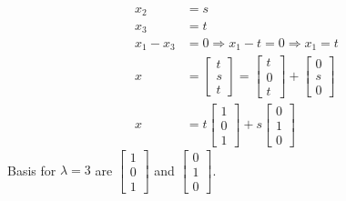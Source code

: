 \documentclass[12pt]{article}
\begin{document}
\begin{align*}
    x_2 &= s\\
    x_3 &= t\\
    x_1 - x_3 &= 0\Rightarrow x_1 - t = 0 \Rightarrow x_1 = t\\
    x &= \begin{bmatrix}t\\s\\t\end{bmatrix} = \begin{bmatrix}t\\0\\t\end{bmatrix} + \begin{bmatrix}0\\s\\0\end{bmatrix}\\
    x &= t\begin{bmatrix}1\\0\\1\end{bmatrix} + s\begin{bmatrix}0\\1\\0\end{bmatrix}
\end{align*}
Basis for $\lambda = 3$ are $\begin{bmatrix}1\\0\\1\end{bmatrix}$ and $\begin{bmatrix}0\\1\\0\end{bmatrix}$.
\end{document}
